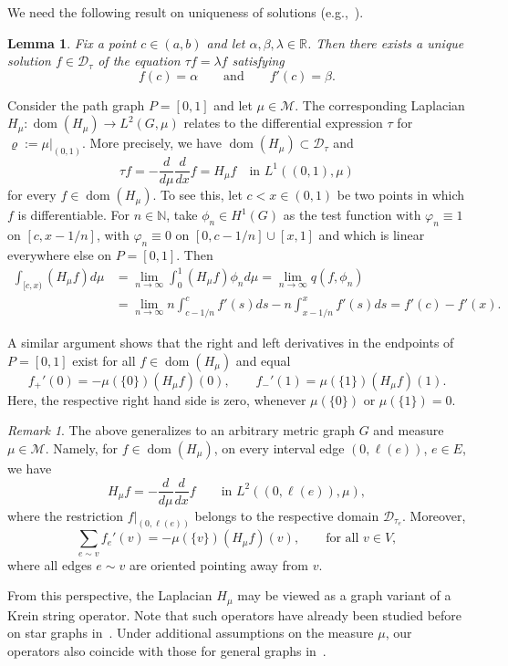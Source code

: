 \documentclass[reqno]{amsart}
\theoremstyle{plain}
\newtheorem{lem}[thm]{Lemma}
\theoremstyle{definition}
\theoremstyle{remark}
\newtheorem{rmk}[thm]{Remark}
\numberwithin{equation}{section}
\newcommand{\N}{\mathbb{N}}     %
\newcommand{\R}{\mathbb{R}}     %
\newcommand{\cM}{\mathcal{M}}
\newcommand{\dom}{\operatorname{dom}}
\begin{document}
We need the following result on uniqueness of solutions (e.g.,~\cite[Theorem 3.1]{Sturm-Liouville}).

\begin{lem}\label{lem: Unique continuation for ODE}
	Fix a point $c\in (a,b)$ and let $\alpha, \beta, \lambda \in \R$. Then there exists a unique solution $f \in \mathcal{D}_\tau$ of the equation $\tau f = \lambda f$ satisfying
	\[
	f(c) = \alpha \qquad \text{and} \qquad f'(c) = \beta.
	\]
\end{lem}


Consider the path graph $P  = [0,1]$ and let $\mu \in \cM$. The corresponding Laplacian $H_\mu \colon \dom(H_\mu) \to L^2(G, \mu) $ relates to the differential expression $\tau$ for $\varrho := \mu |_{(0,1)}$. More precisely, we have $\dom(H_\mu) \subset \mathcal{D}_\tau$ and
\[
\tau f = -\frac{d}{d\mu} \frac{d}{dx} f  = H_\mu f \quad \text{in } L^1((0,1), \mu)
\]
for every $f \in \dom(H_\mu)$. To see this, let $c < x \in(0,1)$ be two points in which $f$ is differentiable. For $n \in \N$, take $\phi_n \in H^1(G)$ as the test function with $\varphi_n \equiv 1$ on $[c, x-1/n]$, with $\varphi_n \equiv 0$ on $[0, c-1/n] \cup [x,1]$ and which is linear everywhere else on $P=[0,1]$. Then 
\begin{align*}
	\int_{[c,x)} (H_\mu f) d \mu &= \lim_{n \to \infty} \int_{0}^{1} (H_\mu f) \phi_n d\mu = \lim_{n \to \infty} q(f, \phi_n) \\
	&= \lim_{n \to \infty} n \int_{c-1/n}^{c} f'(s)ds - n\int_{x-1/n}^{x} f'(s)ds= f'(c) - f'(x).
\end{align*}

A similar argument shows that the right and left derivatives in the endpoints of $P= [0,1]$ exist for all $f \in \dom(H_\mu)$ and equal
\begin{equation} \label{eq:BoundaryConditionsPathGraphs}
	f_+'(0) = - \mu(\{0\}) (H_\mu f) (0), \qquad  f_-'(1) = \mu(\{1\}) (H_\mu f) (1).
\end{equation}
Here, the respective right hand side is zero, whenever $\mu(\{0\})$ or $\mu(\{1\})=0$.
\begin{rmk}
The above generalizes to an arbitrary metric graph $G$ and measure $\mu \in \cM$. Namely, for $f \in \dom(H_\mu)$, on every interval edge $(0, \ell(e))$, $e \in E$, we have
\[
H_\mu f = -\frac{d}{d\mu} \frac{d}{dx} f \qquad \text{in $L^2( (0, \ell(e)), \mu)$},
\]
where the restriction $f|_{(0,\ell(e))}$ belongs to the respective domain $\mathcal{D}_{\tau_e}$. Moreover,
\[
\sum_{e \sim v} f_e'(v) = - \mu(\{v\}) (H_\mu f)(v), \qquad \text{for all $v \in V$},
\]
where all edges $e \sim v$ are oriented pointing away from $v$.

From this perspective, the Laplacian $H_\mu$ may be viewed as a graph variant of a Krein string operator. Note that such operators have already been studied before on star graphs in~\cite{eckhardt, prt}. Under additional assumptions on the measure $\mu$, our operators also coincide with those for general graphs in~\cite{kkv}.
\end{rmk}
\end{document}
